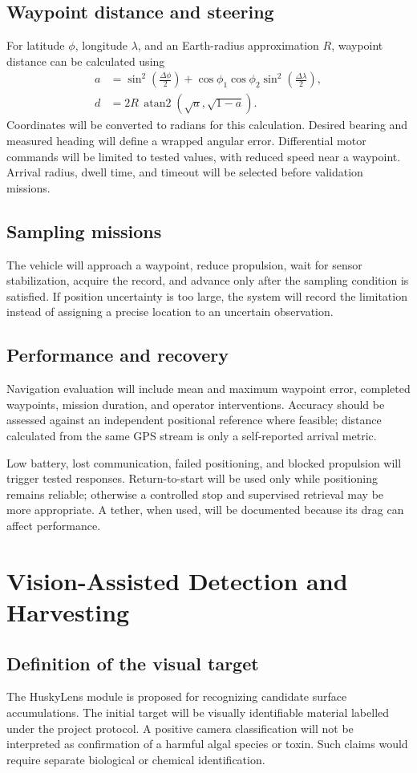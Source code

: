 \documentclass[12pt,a4paper]{article}
\newcommand{\papersection}[1]{\clearpage\section{#1}}
\begin{document}
\subsection{Waypoint distance and steering}
For latitude $\phi$, longitude $\lambda$, and an Earth-radius approximation $R$, waypoint distance can be calculated using
\begin{align}
a&=\sin^2\!\left(\frac{\Delta\phi}{2}\right)
 +\cos\phi_1\cos\phi_2\sin^2\!\left(\frac{\Delta\lambda}{2}\right),\\
d&=2R\,\operatorname{atan2}(\sqrt a,\sqrt{1-a}).
\end{align}
Coordinates will be converted to radians for this calculation. Desired bearing and measured heading will define a wrapped angular error. Differential motor commands will be limited to tested values, with reduced speed near a waypoint. Arrival radius, dwell time, and timeout will be selected before validation missions.

\subsection{Sampling missions}
The vehicle will approach a waypoint, reduce propulsion, wait for sensor stabilization, acquire the record, and advance only after the sampling condition is satisfied. If position uncertainty is too large, the system will record the limitation instead of assigning a precise location to an uncertain observation.

\subsection{Performance and recovery}
Navigation evaluation will include mean and maximum waypoint error, completed waypoints, mission duration, and operator interventions. Accuracy should be assessed against an independent positional reference where feasible; distance calculated from the same GPS stream is only a self-reported arrival metric.

Low battery, lost communication, failed positioning, and blocked propulsion will trigger tested responses. Return-to-start will be used only while positioning remains reliable; otherwise a controlled stop and supervised retrieval may be more appropriate. A tether, when used, will be documented because its drag can affect performance.

\papersection{Vision-Assisted Detection and Harvesting}
\subsection{Definition of the visual target}
The HuskyLens module is proposed for recognizing candidate surface accumulations. The initial target will be visually identifiable material labelled under the project protocol. A positive camera classification will not be interpreted as confirmation of a harmful algal species or toxin. Such claims would require separate biological or chemical identification.
\end{document}

